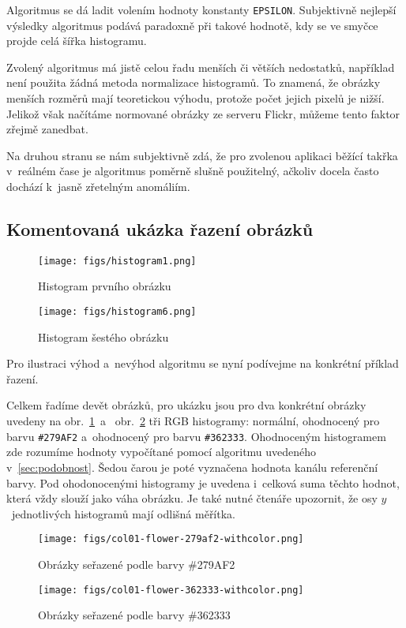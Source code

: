 \documentclass[12pt,oneside,a4paper]{article}
\begin{document}
Algoritmus se dá ladit volením hodnoty konstanty \texttt{EPSILON}. Subjektivně nejlepší výsledky algoritmus podává paradoxně při takové hodnotě, kdy se ve smyčce projde celá šířka histogramu.

Zvolený algoritmus má jistě celou řadu menších či větších nedostatků, například není použita žádná metoda normalizace histogramů. To znamená, že obrázky menších rozměrů mají teoretickou výhodu, protože počet jejich pixelů je nižší. Jelikož však načítáme normované obrázky ze serveru Flickr, můžeme tento faktor zřejmě zanedbat.

Na druhou stranu se nám subjektivně zdá, že pro zvolenou aplikaci běžící takřka v~reálném čase je algoritmus poměrně slušně použitelný, ačkoliv docela často dochází k~jasně zřetelným anomáliím.

\subsection{Komentovaná ukázka řazení obrázků}

\begin{figure} \begin{center}
\texttt{[image: figs/histogram1.png]} \caption{Histogram prvního obrázku}
\label{fig:manchild}
\end{center} \end{figure}
\begin{figure} \begin{center}
\texttt{[image: figs/histogram6.png]} \caption{Histogram šestého obrázku}
\label{fig:borderflower}
\end{center} \end{figure}
Pro ilustraci výhod a~nevýhod algoritmu se nyní podívejme na konkrétní příklad řazení.

Celkem řadíme devět obrázků, pro ukázku jsou pro dva konkrétní obrázky uvedeny na obr.~\ref{fig:manchild}~a~ obr.~\ref{fig:borderflower} tři RGB histogramy: normální, ohodnocený pro barvu \verb|#279AF2| a~ohodnocený pro barvu \verb|#362333|. Ohodnoceným histogramem zde rozumíme hodnoty vypočítané pomocí algoritmu uvedeného v~\ref{sec:podobnost}. Šedou čarou je poté vyznačena hodnota kanálu referenční barvy. Pod ohodonocenými histogramy je uvedena i~celková suma těchto hodnot, která vždy slouží jako váha obrázku. Je také nutné čtenáře upozornit, že osy $y$~jednotlivých histogramů mají odlišná měřítka.

\begin{figure} \begin{center}
\texttt{[image: figs/col01-flower-279af2-withcolor.png]} \caption{Obrázky seřazené podle barvy \#279AF2}
\label{fig:279af2}
\end{center} \end{figure}
\begin{figure} \begin{center}
\texttt{[image: figs/col01-flower-362333-withcolor.png]} \caption{Obrázky seřazené podle barvy \#362333}
\label{fig:362333}
\end{center} \end{figure}
\end{document}
